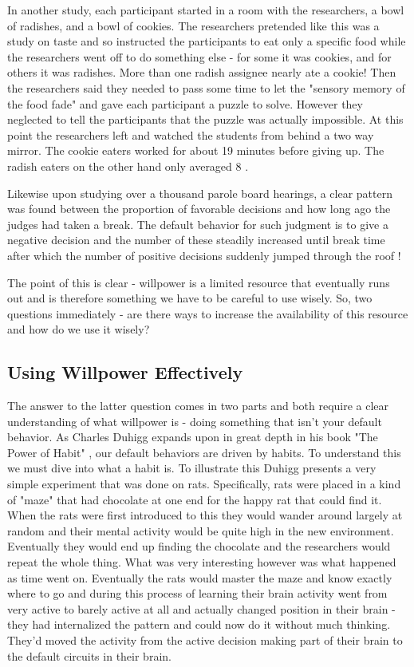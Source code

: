 \documentclass[11pt,a5paper]{book}
\begin{document}
In another study, each participant started in a room with the researchers, a bowl of radishes, and a bowl of cookies. The researchers pretended like this was a study on taste and so instructed the participants to eat only a specific food while the researchers went off to do something else - for some it was cookies, and for others it was radishes. More than one radish assignee nearly ate a cookie! Then the researchers said they needed to pass some time to let the "sensory memory of the food fade" and gave each participant a puzzle to solve. However they neglected to tell the participants that the puzzle was actually impossible. At this point the researchers left and watched the students from behind a two way mirror. The cookie eaters worked for about 19 minutes before giving up. The radish eaters on the other hand only averaged 8 \cite{duhigg}.
\newline

Likewise upon studying over a thousand parole board hearings, a clear pattern was found between the proportion of favorable decisions and how long ago the judges had taken a break. The default behavior for such judgment is to give a negative decision and the number of these steadily increased until break time after which the number of positive decisions suddenly jumped through the roof \cite{keller}! 
\newline 

The point of this is clear - willpower is a limited resource that eventually runs out and is therefore something we have to be careful to use wisely. So, two questions immediately - are there ways to increase the availability of this resource and how do we use it wisely?

\subsection{Using Willpower Effectively}
The answer to the latter question comes in two parts and both require a clear understanding of what willpower is - doing something that isn't your default behavior. As Charles Duhigg expands upon in great depth in his book "The Power of Habit" \cite{duhigg}, our default behaviors are driven by habits. To understand this we must dive into what a habit is. To illustrate this Duhigg presents a very simple experiment that was done on rats. Specifically, rats were placed in a kind of "maze" that had chocolate at one end for the happy rat that could find it. When the rats were first introduced to this they would wander around largely at random and their mental activity would be quite high in the new environment. Eventually they would end up finding the chocolate and the researchers would repeat the whole thing. What was very interesting however was what happened as time went on. Eventually the rats would master the maze and know exactly where to go and during this process of learning their brain activity went from very active to barely active at all and actually changed position in their brain - they had internalized the pattern and could now do it without much thinking. They'd moved the activity from the active decision making part of their brain to the default circuits in their brain. 
\newline
\end{document}
